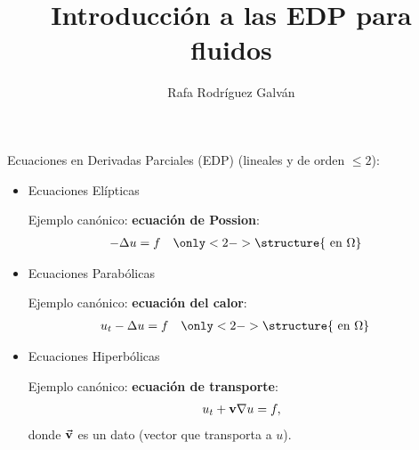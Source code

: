 \documentclass[9pt, dvipsnames,]{beamer}
\title{Introducción a las EDP para fluidos}
\author{Rafa Rodríguez Galván}
\begin{document}

\begin{frame}
\maketitle
\end{frame}


\begin{frame}{Ecuaciones en Derivadas Parciales (EDP)}
   (lineales y de orden $\le 2$):
  \begin{itemize}
  \item Ecuaciones \alert{Elípticas}
      \par\quad Ejemplo canónico: \textbf{ecuación de Possion}:
      \begin{align*}
        -\Delta u &= f \quad \only<2->{\structure{\text{ en  } \Omega}}
      \end{align*}
  \item Ecuaciones \alert{Parabólicas}
      \par\quad Ejemplo canónico: \textbf{ecuación del calor}:
      \begin{align*}
        u_t - \Delta u &= f \quad \only<2->{\structure{\text{ en  } \Omega}}
      \end{align*}
  \item Ecuaciones  \alert{Hiperbólicas}
    \par\quad Ejemplo canónico: \textbf{ecuación de transporte}:
      \begin{align*}
        u_t + \mathbf{v} \nabla u = f,
      \end{align*}
      \quad donde $\vec{\mathbf{v}}$ es un dato (vector que transporta a $u$).
  \end{itemize}
  \medskip
\end{frame}
\end{document}

